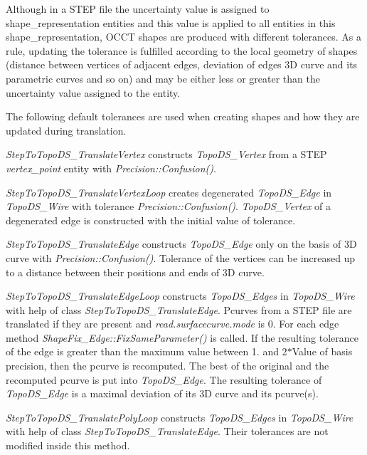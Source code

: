 Although in a S\+T\+EP file the uncertainty value is assigned to shape\+\_\+representation entities and this value is applied to all entities in this shape\+\_\+representation, O\+C\+CT shapes are produced with different tolerances. As a rule, updating the tolerance is fulfilled according to the local geometry of shapes (distance between vertices of adjacent edges, deviation of edge\textquotesingle{}s 3D curve and its parametric curves and so on) and may be either less or greater than the uncertainty value assigned to the entity.

The following default tolerances are used when creating shapes and how they are updated during translation.
\begin{DoxyItemize}
\item {\itshape Step\+To\+Topo\+D\+S\+\_\+\+Translate\+Vertex} constructs {\itshape Topo\+D\+S\+\_\+\+Vertex} from a S\+T\+EP {\itshape vertex\+\_\+point} entity with {\itshape Precision\+::\+Confusion()}.
\item {\itshape Step\+To\+Topo\+D\+S\+\_\+\+Translate\+Vertex\+Loop} creates degenerated {\itshape Topo\+D\+S\+\_\+\+Edge} in {\itshape Topo\+D\+S\+\_\+\+Wire} with tolerance {\itshape Precision\+::\+Confusion()}. {\itshape Topo\+D\+S\+\_\+\+Vertex} of a degenerated edge is constructed with the initial value of tolerance.
\item {\itshape Step\+To\+Topo\+D\+S\+\_\+\+Translate\+Edge} constructs {\itshape Topo\+D\+S\+\_\+\+Edge} only on the basis of 3D curve with {\itshape Precision\+::\+Confusion()}. Tolerance of the vertices can be increased up to a distance between their positions and ends of 3D curve.
\item {\itshape Step\+To\+Topo\+D\+S\+\_\+\+Translate\+Edge\+Loop} constructs {\itshape Topo\+D\+S\+\_\+\+Edges} in {\itshape Topo\+D\+S\+\_\+\+Wire} with help of class {\itshape Step\+To\+Topo\+D\+S\+\_\+\+Translate\+Edge}. Pcurves from a S\+T\+EP file are translated if they are present and {\itshape read.\+surfacecurve.\+mode} is 0. For each edge method {\itshape Shape\+Fix\+\_\+\+Edge\+::\+Fix\+Same\+Parameter()} is called. If the resulting tolerance of the edge is greater than the maximum value between 1. and 2$\ast$\+Value of basis precision, then the pcurve is recomputed. The best of the original and the recomputed pcurve is put into {\itshape Topo\+D\+S\+\_\+\+Edge}. The resulting tolerance of {\itshape Topo\+D\+S\+\_\+\+Edge} is a maximal deviation of its 3D curve and its pcurve(s).
\item {\itshape Step\+To\+Topo\+D\+S\+\_\+\+Translate\+Poly\+Loop} constructs {\itshape Topo\+D\+S\+\_\+\+Edges} in {\itshape Topo\+D\+S\+\_\+\+Wire} with help of class {\itshape Step\+To\+Topo\+D\+S\+\_\+\+Translate\+Edge}. Their tolerances are not modified inside this method.

\end{DoxyItemize}

